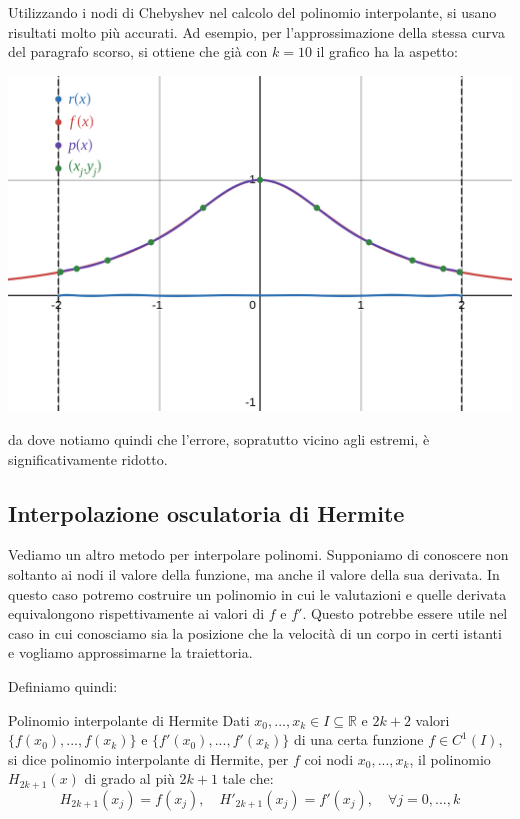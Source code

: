 \documentclass[a4paper,11pt]{article}
\begin{document}
Utilizzando i nodi di Chebyshev nel calcolo del polinomio interpolante, si usano risultati molto più accurati.
Ad esempio, per l'approssimazione della stessa curva del paragrafo scorso, si ottiene che già con $k = 10$ il grafico ha la aspetto:
\begin{center}
	\includegraphics[scale=0.28]{../figures/runge_better.png}
\end{center}
da dove notiamo quindi che l'errore, sopratutto vicino agli estremi, è significativamente ridotto.

\subsection{Interpolazione osculatoria di Hermite}
Vediamo un altro metodo per interpolare polinomi.
Supponiamo di conoscere non soltanto ai nodi il valore della funzione, ma anche il valore della sua derivata.
In questo caso potremo costruire un polinomio in cui le valutazioni e quelle derivata equivalongono rispettivamente ai valori di $f$ e $f'$.
Questo potrebbe essere utile nel caso in cui conosciamo sia la posizione che la velocità di un corpo in certi istanti e vogliamo approssimarne la traiettoria.

Definiamo quindi:
\begin{definition}{Polinomio interpolante di Hermite }
	Dati $x_0, ..., x_k \in I \subseteq \mathbb{R}$ e $2k + 2$ valori $\{f(x_0), ..., f(x_k) \}$ e $\{ f'(x_0), ..., f'(x_k) \}$ di una certa funzione $f \in C^{1}(I)$, si dice polinomio interpolante di Hermite, per $f$ coi nodi $x_0, ..., x_k$, il polinomio $H_{2k + 1}(x)$ di grado al più $2k + 1$ tale che:
	$$
		H_{2k + 1}(x_j) = f(x_j), \quad H'_{2k + 1}(x_j) = f'(x_j), \quad \forall j = 0, ..., k
	$$
\end{definition}
\end{document}

